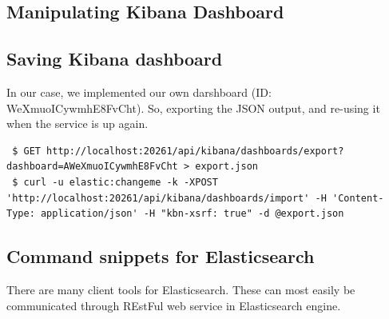 \documentclass[]{article}
\begin{document}
\subsection{Manipulating Kibana
Dashboard}\label{manipulating-kibana-dashboard}

\subsection{Saving Kibana dashboard}\label{saving-kibana-dashboard}

In our case, we implemented our own darshboard (ID:
WeXmuoICywmhE8FvCht). So, exporting the JSON output, and re-using it
when the service is up again.

\begin{verbatim}
 $ GET http://localhost:20261/api/kibana/dashboards/export?dashboard=AWeXmuoICywmhE8FvCht > export.json
 $ curl -u elastic:changeme -k -XPOST 'http://localhost:20261/api/kibana/dashboards/import' -H 'Content-Type: application/json' -H "kbn-xsrf: true" -d @export.json
\end{verbatim}

\subsection{Command snippets for
Elasticsearch}\label{command-snippets-for-elasticsearch}

There are many client tools for Elasticsearch. These can most easily be
communicated through REstFul web service in Elasticsearch engine.
\end{document}
